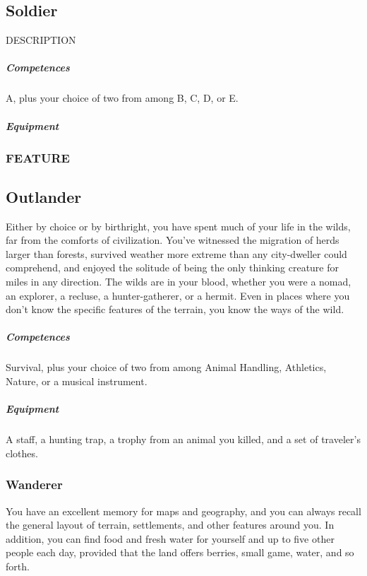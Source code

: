 \subsection*{Soldier} \label{ssec::soldier}
    DESCRIPTION
    \subparagraph{Competences} A, plus your choice of two from among B, C, D, or E.
    \subparagraph{Equipment}
    \subsubsection{FEATURE}

\subsection*{Outlander} \label{ssec::outlander}
    Either by choice or by birthright, you have spent much of your life in the wilds, far from the comforts of civilization.
    You've witnessed the migration of herds larger than forests, survived weather more extreme than any city-dweller could comprehend, and enjoyed the solitude of being the only thinking creature for miles in any direction.
    The wilds are in your blood, whether you were a nomad, an explorer, a recluse, a hunter-gatherer, or a hermit.
    Even in places where you don't know the specific features of the terrain, you know the ways of the wild.
    \subparagraph{Competences} Survival, plus your choice of two from among Animal Handling, Athletics, Nature, or a musical instrument.
    \subparagraph{Equipment} A staff, a hunting trap, a trophy from an animal you killed, and a set of traveler's clothes.
    \subsubsection{Wanderer}
        You have an excellent memory for maps and geography, and you can always recall the general layout of terrain, settlements, and other features around you.
        In addition, you can find food and fresh water for yourself and up to five other people each day, provided that the land offers berries, small game, water, and so forth.


